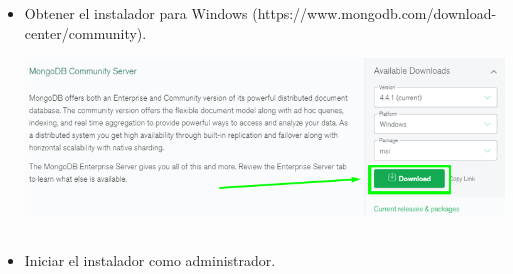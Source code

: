 \documentclass[12pt,a4paper,oneside]{book}
\begin{document}
	\newpage
	\begin{itemize}
		\item {Obtener el instalador para Windows (https://www.mongodb.com/download-center/community).}\\
		
		\includegraphics[width=16cm, height=5cm]{img/1.png}\\

	\item {Iniciar el instalador como administrador.}\\
	

\end{itemize}
\end{document}
